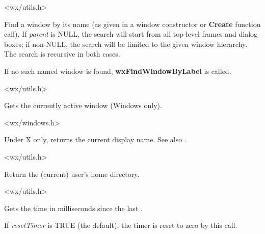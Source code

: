 <wx/utils.h>

\label{wxfindwindowbyname}


Find a window by its name (as given in a window constructor or {\bf Create} function call).
If {\it parent} is NULL, the search will start from all top-level
frames and dialog boxes; if non-NULL, the search will be limited to the given window hierarchy.
The search is recursive in both cases.

If no such named window is found, {\bf wxFindWindowByLabel} is called.


<wx/utils.h>

\label{wxgetactivewindow}


Gets the currently active window (Windows only).


<wx/windows.h>

\label{wxgetdisplayname}


Under X only, returns the current display name. See also .


<wx/utils.h>

\label{wxgethomedir}


Return the (current) user's home directory.




<wx/utils.h>

\label{wxgetelapsedtime}


Gets the time in milliseconds since the last .

If {\it resetTimer} is TRUE (the default), the timer is reset to zero
by this call.

